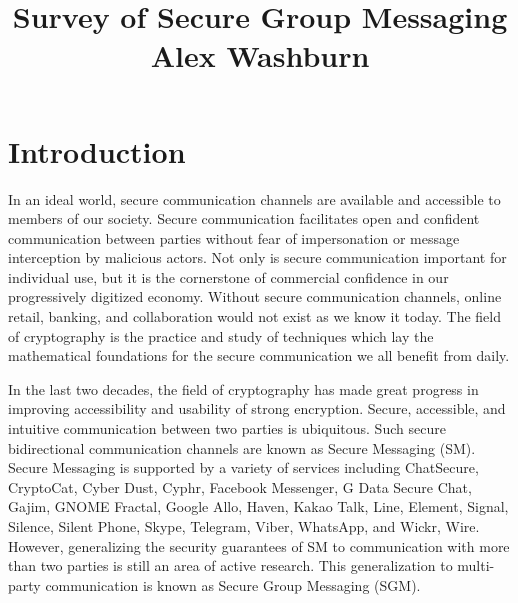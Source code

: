 \documentclass[12pt,twocolumn]{article}
\begin{document}
	
	\author{}
	\date{}
	\title{\vspace{-8ex} \textbf{Survey of Secure Group Messaging}\\ \Large Alex Washburn\vspace{-7ex}}
	\thispagestyle{plain}

	
	\section*{Introduction}
	
	In an ideal world, secure communication channels are available and accessible to members of our society.
	Secure communication facilitates open and confident communication between parties without fear of impersonation or message interception by malicious actors.
	Not only is secure communication important for individual use, but it is the cornerstone of commercial confidence in our progressively digitized economy.
	Without secure communication channels, online retail, banking, and collaboration would not exist as we know it today.
	The field of cryptography is the practice and study of techniques which lay the mathematical foundations for the secure communication we all benefit from daily.
	
	In the last two decades, the field of cryptography has made great progress in improving accessibility and usability of strong encryption.
	Secure, accessible, and intuitive communication between two parties is ubiquitous.
	Such secure bidirectional communication channels are known as Secure Messaging (SM).
	Secure Messaging is supported by a variety of services including ChatSecure, CryptoCat, Cyber Dust, Cyphr, Facebook Messenger, G Data Secure Chat, Gajim, GNOME Fractal, Google Allo, Haven, Kakao Talk, Line, Element, Signal, Silence, Silent Phone, Skype, Telegram, Viber, WhatsApp, and Wickr, Wire.
	However, generalizing the security guarantees of SM to communication with more than two parties is still an area of active research.
	This generalization to multi-party communication is known as Secure Group Messaging (SGM).
	
\end{document}
